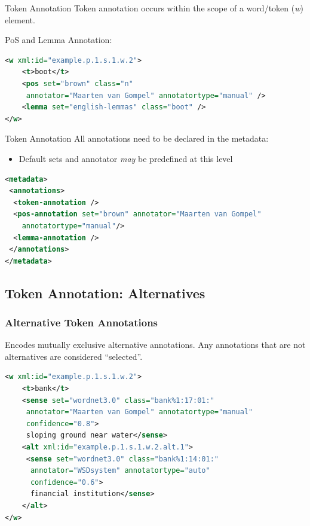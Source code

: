 \documentclass[compress]{beamer}
\begin{document}
\begin{frame}[fragile]
    \begin{block}{Token Annotation}
        Token annotation occurs within the scope of a word/token (\emph{w}) element.
    \end{block}
    \begin{example}
       PoS and Lemma Annotation:
\begin{lstlisting}[language=xml]
<w xml:id="example.p.1.s.1.w.2">
    <t>boot</t>
    <pos set="brown" class="n" 
     annotator="Maarten van Gompel" annotatortype="manual" />
    <lemma set="english-lemmas" class="boot" />
</w>                         
\end{lstlisting}        
    \end{example}
\end{frame}


\begin{frame}[fragile]
    \begin{block}{Token Annotation}
        All annotations need to be declared in the metadata:
        \begin{itemize}
            \item Default sets and annotator \emph{may} be predefined at this level
        \end{itemize}
    \end{block}
    \begin{example}
\begin{lstlisting}[language=xml]
<metadata>
 <annotations>
  <token-annotation />
  <pos-annotation set="brown" annotator="Maarten van Gompel"
    annotatortype="manual"/>
  <lemma-annotation />
 </annotations>
</metadata>                     
\end{lstlisting}        
    \end{example}
\end{frame}

\subsection{Token Annotation: Alternatives}


\begin{frame}[fragile]
\frametitle{Alternative Token Annotations}

Encodes mutually exclusive alternative annotations. Any annotations that are not alternatives are considered ``selected''.

\begin{lstlisting}[language=xml]
<w xml:id="example.p.1.s.1.w.2">
    <t>bank</t>
    <sense set="wordnet3.0" class="bank%1:17:01:"    
     annotator="Maarten van Gompel" annotatortype="manual" 
     confidence="0.8">
     sloping ground near water</sense>
    <alt xml:id="example.p.1.s.1.w.2.alt.1">
     <sense set="wordnet3.0" class="bank%1:14:01:"
      annotator="WSDsystem" annotatortype="auto" 
      confidence="0.6">     
      financial institution</sense> 
    </alt>
</w>                         
\end{lstlisting}        

\end{frame}
\end{document}
